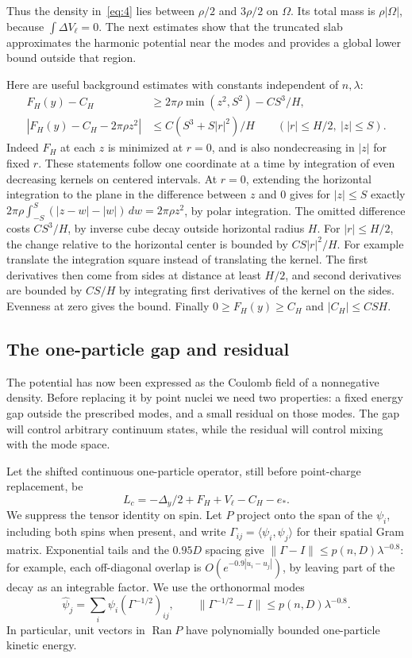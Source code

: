 Thus the density in~\eqref{eq:4} lies between \(\rho/2\) and
\(3\rho/2\) on \(\Omega\). Its total mass is \(\rho|\Omega|\),
because \(\int\Delta V_\ell=0\). The next estimates show that the
truncated slab approximates the harmonic potential near the modes and
provides a global lower bound outside that region.

Here are useful background estimates with constants independent of \(n,\lambda\):
\[
 \begin{split}
 F_H(y)-C_H &\ge 2\pi\rho \min(z^2,S^2)- C S^3/H,\\
 |F_H(y)-C_H-2\pi\rho z^2|
      &\le C(S^3+S|r|^2)/H
           \qquad (|r|\le H/2,\ |z|\le S).
 \end{split}                                                       \tag{5}\label{eq:5}
\]
Indeed \(F_H\) at each \(z\) is minimized at \(r=0\), and is also nondecreasing in \(|z|\) for fixed \(r\). These statements follow one coordinate at a time by integration of even decreasing kernels on centered intervals. At \(r=0\), extending the horizontal integration to the plane in the difference between \(z\) and 0 gives for \(|z|\le S\) exactly \(2\pi\rho\int_{-S}^S(|z-w|-|w|)\,dw=2\pi\rho z^2\), by polar integration. The omitted difference costs \(CS^3/H\), by inverse cube decay outside horizontal radius \(H\). For \(|r|\le H/2\), the change relative to the horizontal center is bounded by \(CS|r|^2/H\). For example translate the integration square instead of translating the kernel. The first derivatives then come from sides at distance at least \(H/2\), and second derivatives are bounded by \(CS/H\) by integrating first derivatives of the kernel on the sides. Evenness at zero gives the bound. Finally \(0\ge F_H(y)\ge C_H\) and \(|C_H|\le CSH\).

\subsection{The one-particle gap and residual}

The potential has now been expressed as the Coulomb field of a
nonnegative density. Before replacing it by point nuclei we need two
properties: a fixed energy gap outside the prescribed modes, and a small
residual on those modes. The gap will control arbitrary continuum
states, while the residual will control mixing with the mode space.

Let the shifted continuous one-particle operator, still before point-charge replacement, be
\[
       L_c=-\Delta_y/2+F_H+V_\ell-C_H-e_* .
\]
We suppress the tensor identity on spin. Let \(P\) project onto the span
of the \(\psi_i\), including both spins when present, and write
\(\Gamma_{ij}=\langle\psi_i,\psi_j\rangle\) for their spatial Gram
matrix. Exponential tails and the \(0.95D\) spacing give
\(\|\Gamma-I\|\le p(n,D)\lambda^{-0.8}\): for example, each
off-diagonal overlap is \(O(e^{-0.9|u_i-u_j|})\), by leaving part of
the decay as an integrable factor. We use the orthonormal modes
\[
 \widehat\psi_j=\sum_i\psi_i(\Gamma^{-1/2})_{ij},\qquad
 \|\Gamma^{-1/2}-I\|\le p(n,D)\lambda^{-0.8}.
\]
In particular, unit vectors in \(\operatorname{Ran}P\) have
polynomially bounded one-particle kinetic energy.

